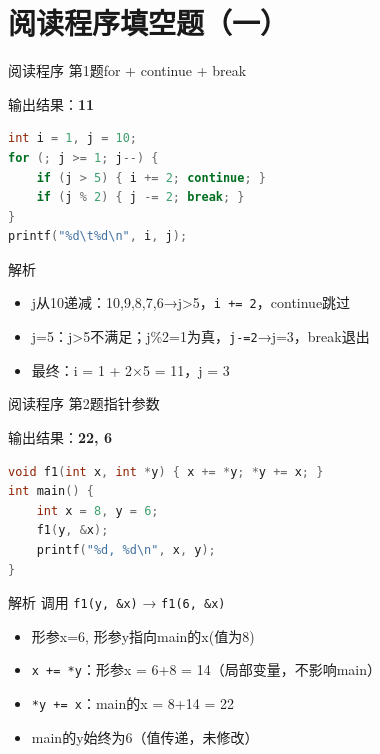 \section{阅读程序填空题（一）}

\begin{frame}[fragile]{阅读程序 第1题}{for + continue + break}
    \begin{exampleblock}{输出结果：\textbf{11}}
    \end{exampleblock}
    \begin{lstlisting}[language=C]
int i = 1, j = 10;
for (; j >= 1; j--) {
    if (j > 5) { i += 2; continue; }
    if (j % 2) { j -= 2; break; }
}
printf("%d\t%d\n", i, j);
\end{lstlisting}
    \pause
    \begin{alertblock}{解析}
        \footnotesize
        \begin{itemize}
            \setlength{\itemsep}{0pt}
            \item j从10递减：10,9,8,7,6→j>5，\texttt{i += 2}，continue跳过
            \item j=5：j>5不满足；j\%2=1为真，\texttt{j-=2}→j=3，break退出
            \item 最终：i = 1 + 2×5 = 11，j = 3
        \end{itemize}
    \end{alertblock}
\end{frame}

\begin{frame}[fragile]{阅读程序 第2题}{指针参数}
    \begin{exampleblock}{输出结果：\textbf{22, 6}}
    \end{exampleblock}
    \begin{lstlisting}[language=C,basicstyle=\scriptsize\ttfamily]
void f1(int x, int *y) { x += *y; *y += x; }
int main() {
    int x = 8, y = 6;
    f1(y, &x);
    printf("%d, %d\n", x, y);
}
\end{lstlisting}
    \pause
    \begin{alertblock}{解析}
        \footnotesize 调用 \texttt{f1(y, \&x)} → \texttt{f1(6, \&x)}
        \begin{itemize}
            \setlength{\itemsep}{0pt}
            \item 形参x=6, 形参y指向main的x(值为8)
            \item \texttt{x += *y}：形参x = 6+8 = 14（局部变量，不影响main）
            \item \texttt{*y += x}：main的x = 8+14 = 22
            \item main的y始终为6（值传递，未修改）
        \end{itemize}
    \end{alertblock}
\end{frame}


